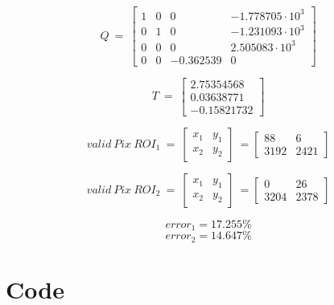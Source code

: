 \begin{appendices}
\begin{equation}\label{eq::Q}
Q\ =\ \begin{bmatrix}
1 & 0 & 0 & -1.778705\cdot10^3\\
0 & 1 & 0 & -1.231093\cdot10^3\\
0 & 0 & 0 & 2.505083\cdot10^3\\
0 & 0 & -0.362539 & 0
\end{bmatrix}
\end{equation}

\begin{equation}\label{eq::T}
T\ =\ \begin{bmatrix}
2.75354568\\
0.03638771\\
-0.15821732
\end{bmatrix}
\end{equation}

\begin{equation}\label{eq::validpix1}
valid\ Pix\ ROI_1\ =\ 
\begin{bmatrix}
x_1 & y_1\\
x_2 & y_2
\end{bmatrix}\ =
\begin{bmatrix}
88 & 6\\
3192 & 2421
\end{bmatrix}
\end{equation}

\begin{equation}\label{eq::validpix2}
valid\ Pix\ ROI_2\ =\ 
\begin{bmatrix}
x_1 & y_1\\
x_2 & y_2
\end{bmatrix}\ =
\begin{bmatrix}
0 & 26\\
3204 & 2378
\end{bmatrix}
\end{equation}

\begin{equation}\label{eq::error1}
error_1 = 17.255\%
\end{equation}
\begin{equation}\label{eq::error2}
error_2 = 14.647\%
\end{equation}



\chapter{Code}


\end{appendices}
